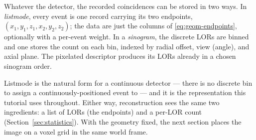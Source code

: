 Whatever the detector, the recorded coincidences can be stored in two ways. In
\emph{listmode}, every event is one record carrying its two endpoints,
$(x_1,y_1,z_1,x_2,y_2,z_2)$; the data are just the columns of
\eqref{eq:geom-endpoints}, optionally with a per-event weight. In a
\emph{sinogram}, the discrete LORs are binned and one stores the count on each
bin, indexed by radial offset, view (angle), and axial plane. The pixelated
descriptor produces its LORs already in a chosen sinogram order.

Listmode is the natural form for a continuous detector --- there is no discrete
bin to assign a continuously-positioned event to --- and it is the
representation this tutorial uses throughout. Either way, reconstruction sees
the same two ingredients: a list of LORs (the endpoints) and a per-LOR count
(Section~\ref{sec:statistics}). With the geometry fixed, the next section places
the image on a voxel grid in the same world frame.
